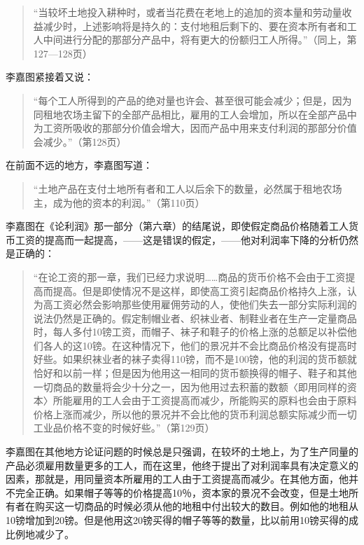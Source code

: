 \begin{quote}{“当较坏土地投入耕种时，或者当花费在老地上的追加的资本量和劳动量收益减少时，上述影响将是持久的：支付地租后剩下的、要在资本所有者和工人中间进行分配的那部分产品中，将有更大的份额归工人所得。”（同上，第127—128页）}\end{quote}

李嘉图紧接着又说：

\begin{quote}{“每个工人所得到的产品的绝对量也许会、甚至很可能会减少；但是，因为同租地农场主留下的全部产品相比，雇用的工人会增加，所以在全部产品中为工资所吸收的那部分价值会增大，因而产品中用来支付利润的那部分价值会减少。”（第128页）}\end{quote}

在前面不远的地方，李嘉图写道：

\begin{quote}{“土地产品在支付土地所有者和工人以后余下的数量，必然属于租地农场主，成为他的资本的利润。”（第110页）}\end{quote}

李嘉图在《论利润》那一部分（第六章）的结尾说，即使假定商品价格随着工人货币工资的提高而一起提高，——这是错误的假定，——他对利润率下降的分析仍然是正确的：

\begin{quote}{“在论工资的那一章，我们已经力求说明……商品的货币价格不会由于工资提高而提高。但是即使情况不是这样，即使高工资引起商品价格持久上涨，认为高工资必然会影响那些使用雇佣劳动的人，使他们失去一部分实际利润的说法仍然是正确的。假定制帽业者、织袜业者、制鞋业者在生产一定量商品时，每人多付10镑工资，而帽子、袜子和鞋子的价格上涨的总额足以补偿他们各人的这10镑。在这种情况下，他们的景况并不会比商品价格没有提高时好些。如果织袜业者的袜子卖得110镑，而不是100镑，他的利润的货币额就恰好和以前一样；但是因为他用这一相同的货币额换得的帽子、鞋子和其他一切商品的数量将会少十分之一，因为他用过去积蓄的数额〈即用同样的资本〉所能雇用的工人会由于工资提高而减少，所能购买的原料也会由于原料价格上涨而减少，所以他的景况并不会比他的货币利润总额实际减少而一切工业品价格不变的时候好些。”（第129页）}\end{quote}

李嘉图在其他地方论证问题的时候总是只强调，在较坏的土地上，为了生产同量的产品必须雇用数量更多的工人，而在这里，他终于提出了对利润率具有决定意义的因素，那就是，用同量资本所雇用的工人由于工资提高而减少。在其他方面，他并不完全正确。如果帽子等等的价格提高10％，资本家的景况不会改变，但是土地所有者在购买这一切商品的时候必须从他的地租中付出较大的数目。例如他的地租从10镑增加到20镑。但是他用这20镑买得的帽子等等的数量，比以前用10镑买得的成比例地减少了。

